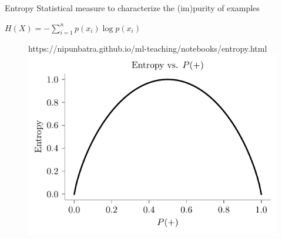 \documentclass[usenames,dvipsnames]{beamer}
\begin{document}

\begin{frame}{Entropy}
 Statistical measure to characterize the
(im)purity of examples

\pause $H(X) = -\sum_{i=1}^n p(x_i) \log p(x_i)$

\begin{figure}[htp]
    \centering
    \begin{notebookbox}{https://nipunbatra.github.io/ml-teaching/notebooks/entropy.html}
      \includegraphics[scale=0.8]{../assets/decision-trees/figures/entropy.pdf}
    \end{notebookbox}
  \end{figure}

\end{frame}
	
\end{document}
